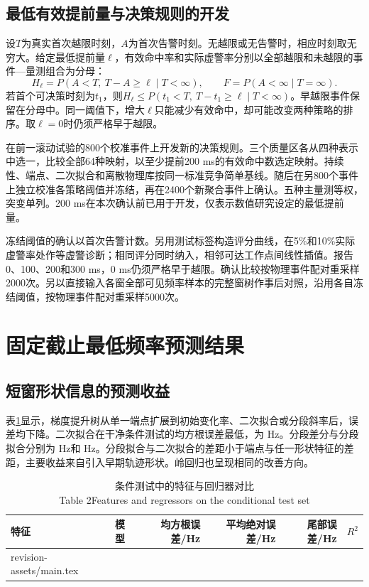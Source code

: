 \documentclass[UTF8,a4paper,11pt]{ctexart}
\makeatletter
\newcommand{\resultrows}[1]{\@@input #1 }
\makeatother
\begin{document}
\subsection{最低有效提前量与决策规则的开发}\label{sec:lead-method}
设$T$为真实首次越限时刻，$A$为首次告警时刻。无越限或无告警时，相应时刻取无穷大。给定最低提前量$\ell$，有效命中率和实际虚警率分别以全部越限和未越限的事件—量测组合为分母：
\begin{equation}
 H_\ell=P(A<T,\ T-A\ge\ell\mid T<\infty),\qquad
 F=P(A<\infty\mid T=\infty).
\end{equation}
若首个可决策时刻为$t_1$，则$H_\ell\le P(t_1<T,\ T-t_1\ge\ell\mid T<\infty)$。早越限事件保留在分母中。同一阈值下，增大$\ell$只能减少有效命中，却可能改变两种策略的排序。取$\ell=0$时仍须严格早于越限。

在前一滚动试验的800个校准事件上开发新的决策规则。三个质量区各从四种表示中选一，比较全部64种映射，以至少提前200 ms的有效命中数选定映射。持续性、端点、二次拟合和离散物理库按同一标准竞争简单基线。随后在另800个事件上独立校准各策略阈值并冻结，再在2400个新聚合事件上确认。五种主量测等权，突变单列。200 ms在本次确认前已用于开发，仅表示数值研究设定的最低提前量。

冻结阈值的确认以首次告警计数。另用测试标签构造评分曲线，在5\%和10\%实际虚警率处作等虚警诊断；相同评分同时纳入，相邻可达工作点间线性插值。报告0、100、200和300 ms，0 ms仍须严格早于越限。确认比较按物理事件配对重采样2000次。另以直接输入各窗全部可见频率样本的完整窗树作事后对照，沿用各自冻结阈值，按物理事件配对重采样5000次。

\section{固定截止最低频率预测结果}
\subsection{短窗形状信息的预测收益}
表\ref{tab:main}显示，梯度提升树从单一端点扩展到初始变化率、二次拟合或分段斜率后，误差均下降。二次拟合在干净条件测试的均方根误差最低，为\MainQuadRMSE{} Hz。分段差分与分段拟合分别为\MainSegmentRMSE{} Hz和\MainFitRMSE{} Hz。分段拟合与二次拟合的差距小于端点与任一形状特征的差距，主要收益来自引入早期轨迹形状。岭回归也呈现相同的改善方向。

\begin{table}[!htbp]
\centering\small
\caption{条件测试中的特征与回归器对比\\Table 2\quad Features and regressors on the conditional test set}
\label{tab:main}
\begin{tabular}{llrrrr}
\toprule
特征 & 模型 & 均方根误差/Hz & 平均绝对误差/Hz & 尾部误差/Hz & $R^2$\\
\midrule
\resultrows{revision-assets/main.tex}
\bottomrule
\end{tabular}
\end{table}
\end{document}
